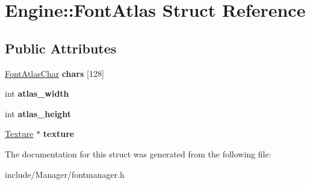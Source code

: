 \hypertarget{structEngine_1_1FontAtlas}{}\section{Engine\+:\+:Font\+Atlas Struct Reference}
\label{structEngine_1_1FontAtlas}
\subsection*{Public Attributes}
\begin{DoxyCompactItemize}
\item 
\hypertarget{structEngine_1_1FontAtlas_a24cccc53bf8444bc8382e6debcc2526c}{}\hyperlink{structEngine_1_1FontAtlasChar}{Font\+Atlas\+Char} {\bfseries chars} \mbox{[}128\mbox{]}\label{structEngine_1_1FontAtlas_a24cccc53bf8444bc8382e6debcc2526c}

\item 
\hypertarget{structEngine_1_1FontAtlas_a3034ba7866ba14966704f9c4d777f9c5}{}int {\bfseries atlas\+\_\+width}\label{structEngine_1_1FontAtlas_a3034ba7866ba14966704f9c4d777f9c5}

\item 
\hypertarget{structEngine_1_1FontAtlas_a29eca98267fd0b2e0acb9e6eff80bae4}{}int {\bfseries atlas\+\_\+height}\label{structEngine_1_1FontAtlas_a29eca98267fd0b2e0acb9e6eff80bae4}

\item 
\hypertarget{structEngine_1_1FontAtlas_af1906195c4a6e0f3d73a2328ac34b6bd}{}\hyperlink{classEngine_1_1Texture}{Texture} $\ast$ {\bfseries texture}\label{structEngine_1_1FontAtlas_af1906195c4a6e0f3d73a2328ac34b6bd}

\end{DoxyCompactItemize}


The documentation for this struct was generated from the following file\+:\begin{DoxyCompactItemize}
\item 
include/\+Manager/fontmanager.\+h\end{DoxyCompactItemize}
